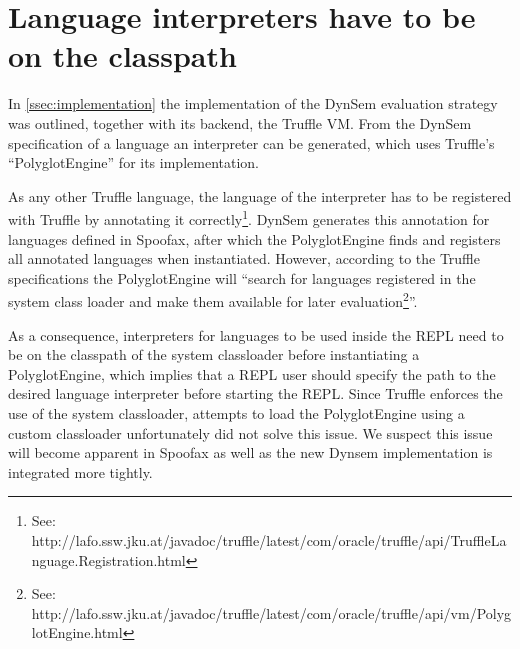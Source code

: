 \section{Language interpreters have to be on the classpath}
\label{sec:classpath}

In \cref{ssec:implementation} the implementation of the DynSem evaluation
strategy was outlined, together with its backend, the Truffle VM.
From the DynSem specification of a language an interpreter can be generated,
which uses Truffle's ``PolyglotEngine'' for its implementation.

As any other Truffle language, the language of the interpreter has to be
registered with Truffle by annotating it correctly\footnote{See:
http://lafo.ssw.jku.at/javadoc/truffle/latest/com/oracle/truffle/api/TruffleLanguage.Registration.html}.
DynSem generates this annotation for languages defined in Spoofax, after which
the PolyglotEngine finds and registers all annotated languages when
instantiated. However, according to the Truffle specifications the
PolyglotEngine will ``search for languages registered in the system class
loader and make them available for later evaluation\footnote{See:
http://lafo.ssw.jku.at/javadoc/truffle/latest/com/oracle/truffle/api/vm/PolyglotEngine.html}''.

As a consequence, interpreters for languages to be used inside the REPL need to
be on the classpath of the system classloader before instantiating a
PolyglotEngine, which implies that a REPL user should specify the path to
the desired language interpreter before starting the REPL. Since Truffle
enforces the use of the system classloader, attempts to load the
PolyglotEngine using a custom classloader unfortunately did not solve this
issue. We suspect this issue will become apparent in Spoofax as well as the new
Dynsem implementation is integrated more tightly.

